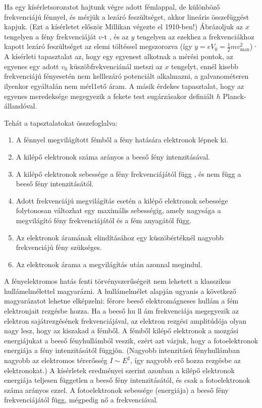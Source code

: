 \documentclass[a4paper,12pt]{article}
\begin{document}
Ha egy kísérletsorozatot hajtunk végre adott fémlappal, de különböző frekvenciájú fénnyel, és mérjük a lezáró feszültséget, akkor lineáris összefüggést kapjuk. (Ezt a kísérletet először Millikan végezte
el 1910-ben!) Ábrázoljuk az $x$ tengelyen a fény frekvenciáját $v$-t , és az $y$ tengelyen az ezekhez a frekvenciákhoz kapott lezáró feszültséget az elemi töltéssel megszorozva 
(így $y = eV_0 = \frac{1}{2}mv_{\text{max}}^2$)· A kísérleti tapasztalat az, hogy egy egyenest alkotnak a mérési pontok, az egyenes egy adott $v_0$ küszöbfrekvenciánál metszi az $x$ tengelyt, 
ennél kisebb frekvenciájú fényesetén nem kelllezáró potenciált alkalmazni, a galvanométeren ilyenkor egyáltalán nem mérl1ető áram. A másik érdekes tapasztalat, hogy az egyenes meredeksége megegyezik a fekete test sugárzásakor definiált $h$ Planck-állandóval.

Tehát a tapsztalatokat összefoglalva:
\begin{enumerate}
    \item A fénnyel megvilágított fémből a fény hatására elektronok lépnek ki.
    \item A kilépő elektronok száma arányos a beeső fény intenzitásával.
    \item A kilépő elektronok sebessége a fény frekvenciájától függ , és nem függ a beeső fény intenzitásától.
    \item Adott frekvenciájú megvilágítás esetén a kilépő elektronok sebessége folytonosan változhat egy maximális sebességig, amely nagysága a megvilágító fény frekvenciájától és a fém anyagától függ.
    \item Az elektronok áramának elindításához egy küszöbértéknél nagyobb frekvenciájú fény szükséges.
    \item Az elektronok árama a megvilágítás után azonnal megindul.
\end{enumerate}

A fényelektromos hatás fenti törvényszerűségeit nem lehetett a klasszikus hullámelmélettel magyarázni. A hullámelmélet alapján ugyanis a következő magyarázatot lehetne elképzelni: férore beeső elektromágneses hullám a
fém elektronjait rezgésbe hozza. Ha a beeső hu ll ám frekvenciája megegyezik az elektron sajátrezgésének frekvenciájával, az elektron rezgési amplitúdója olyan nagy lesz, hogy az kiszakad a fémből. A fémből kilépő elektronok a
mozgási energiájukat a beeső fényhullámból veszik, ezért azt várjuk, hogy a fotoelektronok energiája a fény intenzitásától függjön. (Nagyobb intenzitású fényhullámban nagyobb az elektromos térerősség $I \sim E^2$, így nagyobb
erő hozza rezgésbe az elektronokat.) A kísérletek eredményei szerint azonban a kilépő elektronok energiája teljesen független a beeső fény intenzitásától, és csak a fotoelektronok száma arányos ezzel. A fotoelektronok sebessége
(energiája) a beeső fény frekvenciájától függ, mégpedig nő a frekvenciával.
\end{document}

